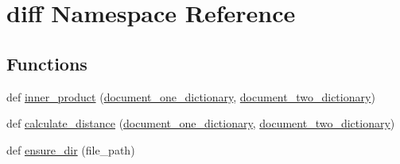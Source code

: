 \hypertarget{namespacediff}{}\section{diff Namespace Reference}
\label{namespacediff}
\subsection*{Functions}
\begin{DoxyCompactItemize}
\item 
def \hyperlink{namespacediff_a3a1a3f01a48273670935a0fc45b8975f}{inner\+\_\+product} (\hyperlink{namespacediff_aa4da046a613de2dafe03d105bca31694}{document\+\_\+one\+\_\+dictionary}, \hyperlink{namespacediff_a00ac707250a54a82a970c2bb2acf736a}{document\+\_\+two\+\_\+dictionary})
\item 
def \hyperlink{namespacediff_a0b1fc82894743728455b31d3e9ec3671}{calculate\+\_\+distance} (\hyperlink{namespacediff_aa4da046a613de2dafe03d105bca31694}{document\+\_\+one\+\_\+dictionary}, \hyperlink{namespacediff_a00ac707250a54a82a970c2bb2acf736a}{document\+\_\+two\+\_\+dictionary})
\item 
def \hyperlink{namespacediff_ac7ecd54dde7759dd5569ffb765995278}{ensure\+\_\+dir} (file\+\_\+path)
\end{DoxyCompactItemize}
